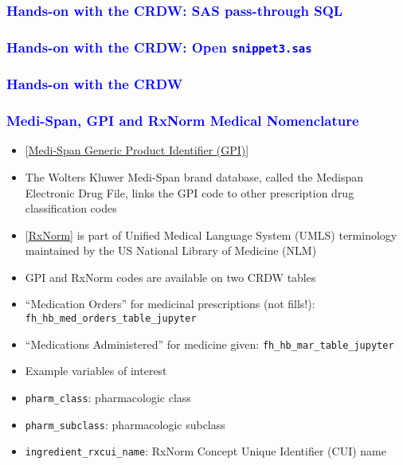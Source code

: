 \documentclass[11pt,pdftex,dvipsnames,usenames]{beamer}
\begin{document}
\begin{frame}[fragile]
\frametitle{\bf\textcolor{blue}{Hands-on with the CRDW: SAS pass-through SQL}}

\end{frame}

\begin{frame}[fragile]
\frametitle{\bf\textcolor{blue}{Hands-on with the CRDW:
Open \texttt{snippet3.sas}}}

\end{frame}

\begin{comment}
\begin{frame}[fragile]
\frametitle{\bf\textcolor{blue}{Hands-on with the CRDW:
Open \texttt{snippet4.sas}}}

\end{frame}
\end{comment}

\begin{frame}[fragile]\frametitle{\bf\textcolor{blue}{Hands-on with the CRDW}}

\end{frame}

\begin{frame}[fragile]\frametitle{\bf\textcolor{blue}{Medi-Span, GPI and RxNorm
Medical Nomenclature}}
\begin{itemize}
\item \textcolor{PineGreen}{[\href{https://www.wolterskluwer.com/en/solutions/medi-span/about/gpi}
{Medi-Span Generic Product Identifier (GPI)}]}
\item The Wolters Kluwer Medi-Span brand database, called the Medispan
  Electronic Drug File, links the GPI code to other prescription drug
  classification codes
\item \textcolor{PineGreen}{[\href{https://www.nlm.nih.gov/research/umls/rxnorm/index.html}{RxNorm}]} is part of Unified Medical Language System (UMLS)
  terminology maintained by the US National Library
  of Medicine (NLM)
\item GPI and RxNorm codes are available on two CRDW tables
\item ``Medication Orders'' for medicinal prescriptions (not fills!): \texttt{fh\_hb\_med\_orders\_table\_jupyter}
\item ``Medications Administered'' for medicine given: \texttt{fh\_hb\_mar\_table\_jupyter} 
\item Example variables of interest
\item \texttt{pharm\_class}: pharmacologic class
\item \texttt{pharm\_subclass}: pharmacologic subclass
\item \texttt{ingredient\_rxcui\_name}: RxNorm Concept Unique Identifier (CUI) name
\end{itemize}
\end{frame}
\end{document}
